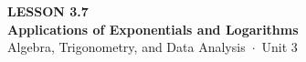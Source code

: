 \documentclass[aspectratio=169, 11pt]{beamer}
\begin{document}
{
\begin{frame}[plain]
  \vspace{2.8cm}\hspace{0.55cm}%
  \begin{minipage}{0.9\textwidth}
    {\color{goldacc}\bfseries\small LESSON 3.7}\\[0.5cm]
    {\color{white}\bfseries\LARGE Applications of Exponentials and Logarithms}\\[1.2cm]
    {\color{mistmid}\small Algebra, Trigonometry, and Data Analysis~$\cdot$~Unit 3}
  \end{minipage}
\end{frame}
}

\begin{frame}[t, plain]
\end{frame}
\end{document}

